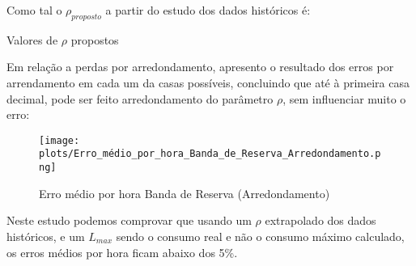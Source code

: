 Como tal o $\rho_{proposto}$ a partir do estudo dos dados  históricos é: \

\begin{table}[H] \centering \caption{Valores de $\rho$ propostos}  \end{table}



Em relação a perdas por arredondamento, apresento o resultado dos erros por arrendamento em cada um da casas possíveis, concluindo que até à primeira casa decimal, pode ser feito arredondamento do parâmetro $\rho$, sem influenciar muito o erro: \\


\begin{figure}[H]
    \centering
    \texttt{[image: plots/Erro\_médio\_por\_hora\_Banda\_de\_Reserva\_Arredondamento.png]}
    \caption{Erro médio por hora Banda de Reserva (Arredondamento)}
\end{figure}



Neste estudo podemos comprovar que usando um $\rho$ extrapolado dos dados históricos, e um $L_{max}$ sendo o consumo real e não o consumo máximo calculado, os erros médios por hora ficam abaixo dos 5\%.\\